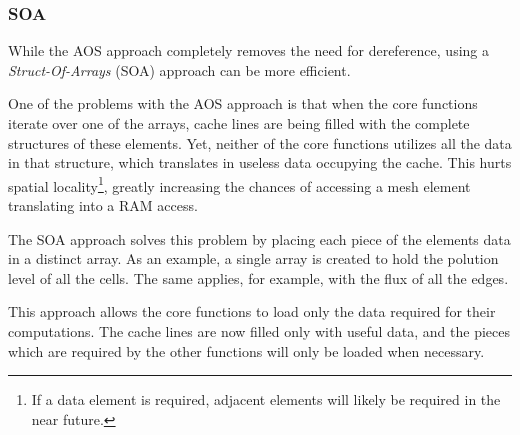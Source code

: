 \subsubsection{SOA}


While the AOS approach completely removes the need for dereference, using a \textit{Struct-Of-Arrays} (SOA) approach can be more efficient.

One of the problems with the AOS approach is that when the core functions iterate over one of the arrays, cache lines are being filled with the complete structures of these elements.
Yet, neither of the core functions utilizes all the data in that structure, which translates in useless data occupying the cache.
This hurts spatial locality\footnote{If a data element is required, adjacent elements will likely be required in the near future.}, greatly increasing the chances of accessing a mesh element translating into a RAM access.

The SOA approach solves this problem by placing each piece of the elements data in a distinct array. As an example, a single array is created to hold the polution level of all the cells.
The same applies, for example, with the flux of all the edges.

This approach allows the core functions to load only the data required for their computations.
The cache lines are now filled only with useful data, and the pieces which are required by the other functions will only be loaded when necessary.

